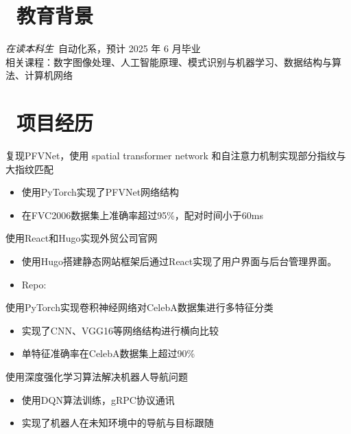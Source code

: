 \documentclass{resume}
\begin{document}


 
\section{\faGraduationCap\  教育背景}
\textit{在读本科生}\ 自动化系，预计 2025 年 6 月毕业\\
相关课程：数字图像处理、人工智能原理、模式识别与机器学习、数据结构与算法、计算机网络

\section{\faUsers\ 项目经历}
复现PFVNet，使用 spatial transformer network 和自注意力机制实现部分指纹与大指纹匹配
\begin{itemize}
  \item 使用PyTorch实现了PFVNet网络结构
  \item 在FVC2006数据集上准确率超过95\%，配对时间小于60ms
\end{itemize}

使用React和Hugo实现外贸公司官网
\begin{itemize}
  \item 使用Hugo搭建静态网站框架后通过React实现了用户界面与后台管理界面。
  \item Repo: 
\end{itemize}

使用PyTorch实现卷积神经网络对CelebA数据集进行多特征分类
\begin{itemize}
  \item 实现了CNN、VGG16等网络结构进行横向比较
  \item 单特征准确率在CelebA数据集上超过90\%
\end{itemize}

使用深度强化学习算法解决机器人导航问题
\begin{itemize}
  \item 使用DQN算法训练，gRPC协议通讯
  \item 实现了机器人在未知环境中的导航与目标跟随
\end{itemize}
\end{document}
